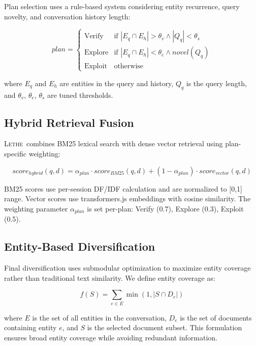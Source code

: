\documentclass[letterpaper]{article}
\newcommand{\lethe}{\textsc{Lethe}}
\begin{document}
Plan selection uses a rule-based system considering entity recurrence, query novelty, and conversation history length:

\begin{equation}
plan = \begin{cases}
\text{Verify} & \text{if } |E_q \cap E_h| > \theta_v \land |Q_q| < \theta_s \\
\text{Explore} & \text{if } |E_q \cap E_h| < \theta_e \land novel(Q_q) \\
\text{Exploit} & \text{otherwise}
\end{cases}
\end{equation}

where $E_q$ and $E_h$ are entities in the query and history, $Q_q$ is the query length, and $\theta_v$, $\theta_e$, $\theta_s$ are tuned thresholds.

\subsection{Hybrid Retrieval Fusion}

\lethe\ combines BM25 lexical search with dense vector retrieval using plan-specific weighting:

\begin{equation}
score_{hybrid}(q, d) = \alpha_{plan} \cdot score_{BM25}(q, d) + (1 - \alpha_{plan}) \cdot score_{vector}(q, d)
\end{equation}

BM25 scores use per-session DF/IDF calculation and are normalized to [0,1] range. Vector scores use transformers.js embeddings with cosine similarity. The weighting parameter $\alpha_{plan}$ is set per-plan: Verify (0.7), Explore (0.3), Exploit (0.5).

\subsection{Entity-Based Diversification}

Final diversification uses submodular optimization to maximize entity coverage rather than traditional text similarity. We define entity coverage as:

\begin{equation}
f(S) = \sum_{e \in E} \min(1, |S \cap D_e|)
\end{equation}

where $E$ is the set of all entities in the conversation, $D_e$ is the set of documents containing entity $e$, and $S$ is the selected document subset. This formulation ensures broad entity coverage while avoiding redundant information.
\end{document}
